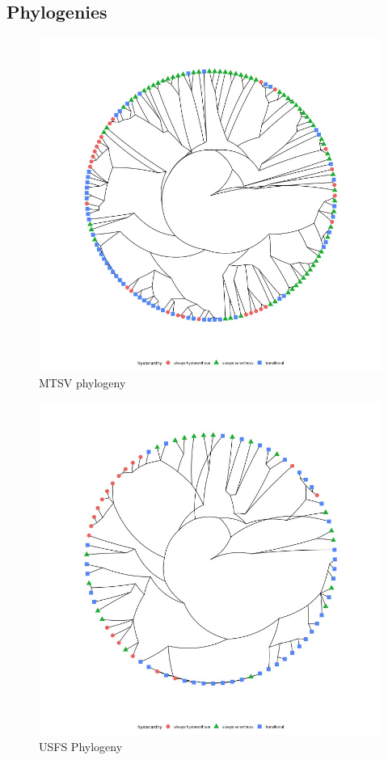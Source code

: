 \documentclass[12pt]{article}\usepackage[]{graphicx}\usepackage[]{color}
\begin{document}
\subsection*{Phylogenies}
 \begin{figure}
    \centering
    \includegraphics[height=.4\textheight]{..//figure/michtreeplot.jpeg}
    \caption{MTSV phylogeny}
    \label{fig:Figure 8}
    \end{figure}
    
     \begin{figure}
    \centering
    \includegraphics[height=.4\textheight]{..//figure/silvtreeplot.jpeg}
    \caption{USFS Phylogeny}
    \label{fig:Figure 9}
    \end{figure}
    
\end{document}
